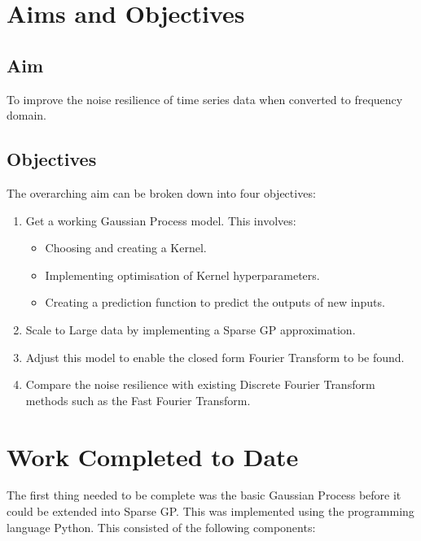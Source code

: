 \documentclass[12pt]{article}
\begin{document}
    \section{Aims and Objectives}
    \subsection{Aim}
    To improve the noise resilience of time series data when converted to frequency domain.

    \subsection{Objectives}
    The overarching aim can be broken down into four objectives:
        \begin{enumerate}
            \item Get a working Gaussian Process model.
            This involves:
                \begin{itemize}
                    \item Choosing and creating a Kernel.
                    \item Implementing optimisation of Kernel hyperparameters. \label{item:nll}
                    \item Creating a prediction function to predict the outputs of new inputs. \label{item:predict}
                \end{itemize}
            \item Scale to Large data by implementing a Sparse GP approximation.
            \item Adjust this model to enable the closed form Fourier Transform to be found.
            \item Compare the noise resilience with existing Discrete Fourier Transform methods such as the Fast Fourier Transform.
        \end{enumerate}

    \section{Work Completed to Date}
    The first thing needed to be complete was the basic Gaussian Process before it could be extended into Sparse GP\@.
    This was implemented using the programming language Python.
    This consisted of the following components:
\end{document}
